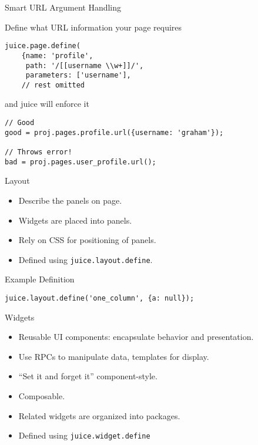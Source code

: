\documentclass{beamer}
\begin{document}
\begin{frame}[fragile]{Smart URL Argument Handling}

Define what URL information your page requires

\begin{verbatim}
juice.page.define(
    {name: 'profile',
     path: '/[[username \\w+]]/',
     parameters: ['username'],
    // rest omitted
\end{verbatim}

and juice will enforce it

\begin{verbatim}
// Good
good = proj.pages.profile.url({username: 'graham'});

// Throws error!
bad = proj.pages.user_profile.url();
\end{verbatim}

\end{frame}


\begin{frame}{Layout}
  \begin{itemize}
  \item Describe the panels on page.
  \item Widgets are placed into panels.
  \item Rely on CSS for positioning of panels.
  \item Defined using \texttt{juice.layout.define}.
  \end{itemize}
\end{frame}

\begin{frame}[fragile]{Example Definition}
\begin{verbatim}
juice.layout.define('one_column', {a: null});
\end{verbatim}
\end{frame}

\begin{frame}{Widgets}
  \begin{itemize}
  \item Reusable UI components: encapsulate behavior and presentation.
  \item Use RPCs to manipulate data, templates for display.
  \item ``Set it and forget it'' component-style.
  \item Composable.
  \item Related widgets are organized into packages.
  \item Defined using \texttt{juice.widget.define}
  \end{itemize}
\end{frame}
\end{document}
